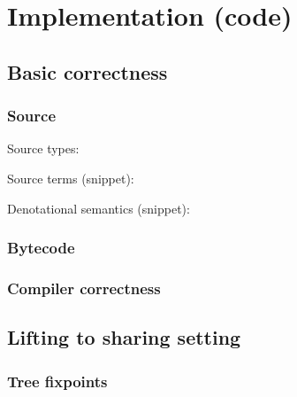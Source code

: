 \section{Implementation (code)}

    \subsection{Basic correctness}

        \begin{frame}
            \frametitle{Source}

            Source types:

            Source terms (snippet):

            Denotational semantics (snippet):
        \end{frame}

        \begin{frame}
            \frametitle{Bytecode}


        \end{frame}

        \begin{frame}
            \frametitle{Compiler correctness}
        \end{frame}


    \subsection{Lifting to sharing setting}
        \begin{frame}
            \frametitle{Tree fixpoints}

        \end{frame}

